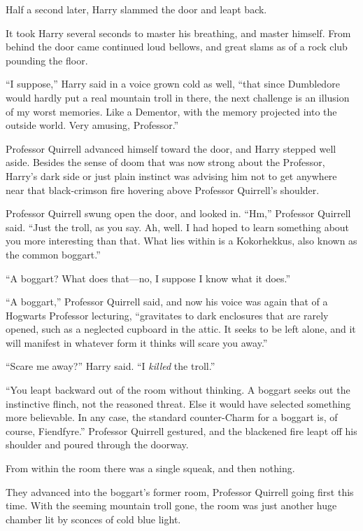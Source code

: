 \later

Half a second later, Harry slammed the door and leapt back.

It took Harry several seconds to master his breathing, and master himself. From behind the door came continued loud bellows, and great slams as of a rock club pounding the floor.

“I suppose,” Harry said in a voice grown cold as well, “that since Dumbledore would hardly put a real mountain troll in there, the next challenge is an illusion of my worst memories. Like a Dementor, with the memory projected into the outside world. Very amusing, Professor.”

Professor Quirrell advanced himself toward the door, and Harry stepped well aside. Besides the sense of doom that was now strong about the Professor, Harry’s dark side or just plain instinct was advising him not to get anywhere near that black-crimson fire hovering above Professor Quirrell’s shoulder.

Professor Quirrell swung open the door, and looked in. “Hm,” Professor Quirrell said. “Just the troll, as you say. Ah, well. I had hoped to learn something about you more interesting than that. What lies within is a Kokorhekkus, also known as the common boggart.”

“A boggart? What does that—no, I suppose I know what it does.”

“A boggart,” Professor Quirrell said, and now his voice was again that of a Hogwarts Professor lecturing, “gravitates to dark enclosures that are rarely opened, such as a neglected cupboard in the attic. It seeks to be left alone, and it will manifest in whatever form it thinks will scare you away.”

“Scare me away?” Harry said. “I \emph{killed} the troll.”

“You leapt backward out of the room without thinking. A boggart seeks out the instinctive flinch, not the reasoned threat. Else it would have selected something more believable. In any case, the standard counter-Charm for a boggart is, of course, Fiendfyre.” Professor Quirrell gestured, and the blackened fire leapt off his shoulder and poured through the doorway.

From within the room there was a single squeak, and then nothing.

They advanced into the boggart’s former room, Professor Quirrell going first this time. With the seeming mountain troll gone, the room was just another huge chamber lit by sconces of cold blue light.

